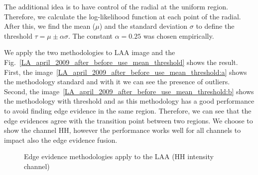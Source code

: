 \documentclass[remotesensing,article,submit,pdftex,moreauthors]{Definitions/mdpi}
\begin{document}
The additional idea is to have control of the radial at the uniform region. Therefore, we calculate the log-likelihood function at each point of the radial. After this, we find the mean ($\mu$) and the standard deviation $\sigma$ to define the threshold $\tau=\mu \pm \alpha \sigma$. The constant $\alpha = 0.25$ was chosen empirically. 

We apply the two methodologies to LAA image and the Fig.~\eqref{LA_april_2009_after_before_use_mean_threshold} shows the result. First, the image~\eqref{LA_april_2009_after_before_use_mean_threshold:a} shows the methodology standard and with it we can see the presence of outliers. Second, the image~\eqref{LA_april_2009_after_before_use_mean_threshold:b} shows the methodology with threshold and as this methodology has a good performance to avoid finding edge evidence in the same region. Therefore, we can see that the edge evidences agree with the transition point between two regions. We choose to show the channel HH, however the performance works well for all channels to impact also the edge evidence fusion.  
\begin{figure}[hbt]
	\centering
     \caption{Edge evidence methodologies apply to the LAA (HH intensity channel)}
     \label{LA_april_2009_after_before_use_mean_threshold} 
   \end{figure}
\end{document}

